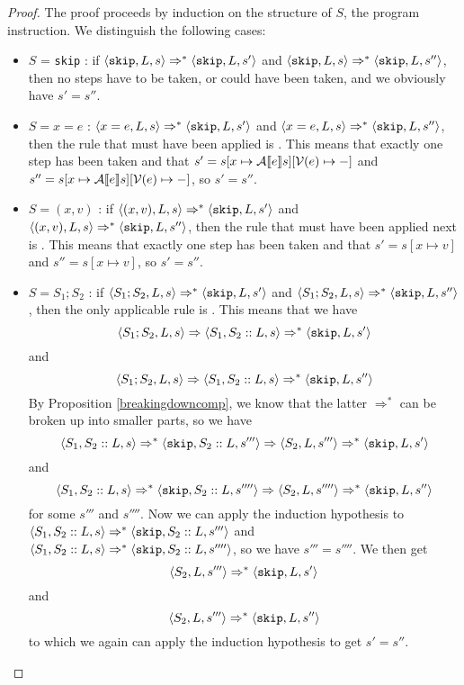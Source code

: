 \begin{proof}
The proof proceeds by induction on the structure of $S$, the program instruction. We distinguish the following cases:
\begin{itemize}[noitemsep]
    \item $S$ = \texttt{skip} : if $\langle \texttt{skip}, L, s \rangle \Rightarrow ^{*} \langle \texttt{skip}, L, s' \rangle$ and $\langle \texttt{skip}, L, s \rangle \Rightarrow ^{*} \langle \texttt{skip}, L, s'' \rangle$, then no steps have to be taken, or could have been taken, and we obviously have $s' = s''$.
    \item $S = x = e$ : $\langle x= e, L, s \rangle \Rightarrow ^{*} \langle \texttt{skip}, L, s' \rangle$ and $\langle x = e, L, s \rangle \Rightarrow ^{*} \langle \texttt{skip}, L, s'' \rangle$, then the rule that must have been applied is \asssos. This means that exactly one step has been taken and that $s'=s[x \mapsto \mathcal{A} \llbracket e \rrbracket s][\mathcal{V}(e)\mapsto-]$ and $s'' = s[x \mapsto \mathcal{A} \llbracket e \rrbracket s][\mathcal{V}(e)\mapsto-]$, so $s' = s''$.
    \item $S = (x,v)$ : if $\langle (x,v), L, s \rangle \Rightarrow ^{*} \langle \texttt{skip}, L, s' \rangle$ and $\langle (x,v), L, s \rangle \Rightarrow ^{*} \langle \texttt{skip}, L, s'' \rangle$, then the rule that must have been applied next is \setsos. This means that exactly one step has been taken and that $s' = s[x\mapsto v]$ and $s'' = s[x\mapsto v]$, so $s' = s''$.
    \item $S = S_1; S_2$ : if $\langle S_1; S_2, L, s \rangle \Rightarrow ^{*} \langle \texttt{skip}, L, s' \rangle$ and $\langle S_1; S_2, L, s \rangle \Rightarrow ^{*} \langle \texttt{skip}, L, s'' \rangle$, then the only applicable rule is \compsos. This means that we have 
    $$\langle S_1; S_2, L, s \rangle \Rightarrow \langle S_1, S_2::L, s \rangle \Rightarrow ^{*} \langle \texttt{skip}, L, s' \rangle$$
    and 
    $$\langle S_1; S_2, L, s \rangle \Rightarrow \langle S_1, S_2::L, s \rangle  \Rightarrow ^{*} \langle \texttt{skip}, L, s'' \rangle$$
    By Proposition \ref{breakingdowncomp}, we know that the latter $\Rightarrow ^{*}$ can be broken up into smaller parts, so we have 
     $$\langle S_1, S_2::L, s \rangle \Rightarrow ^{*} \langle \texttt{skip}, S_2::L, s''' \rangle \Rightarrow \langle S_2, L, s''' \rangle \Rightarrow ^{*} \langle \texttt{skip}, L, s' \rangle$$
     and
     $$\langle S_1, S_2::L, s \rangle \Rightarrow ^{*} \langle \texttt{skip}, S_2::L, s'''' \rangle \Rightarrow \langle S_2, L, s'''' \rangle \Rightarrow ^{*} \langle \texttt{skip}, L, s'' \rangle$$
     for some $s'''$ and $s''''$. Now we can apply the induction hypothesis to $\langle S_1, S_2::L, s \rangle \Rightarrow ^{*} \langle \texttt{skip}, S_2::L, s''' \rangle$ and $\langle S_1, S_2::L, s \rangle \Rightarrow ^{*} \langle \texttt{skip}, S_2::L, s'''' \rangle$, so we have $s''' = s''''$. We then get
     $$\langle S_2, L, s''' \rangle \Rightarrow ^{*} \langle \texttt{skip}, L, s' \rangle$$
     and 
     $$\langle S_2, L, s''' \rangle \Rightarrow ^{*} \langle \texttt{skip}, L, s'' \rangle$$
     to which we again can apply the induction hypothesis to get $s' = s''$.
     

\end{itemize}
\end{proof}
